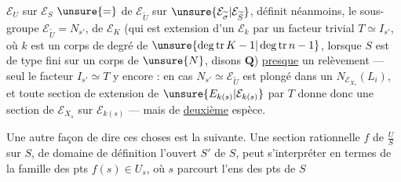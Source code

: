 $\mathcal E_U$ sur $\mathcal E_S$  $\unsure{=}$ de $\mathcal E_{\widetilde U}$ sur $\unsure{\mathcal E_{\widetilde\sigma}|\mathcal E_{\widetilde S}}$, définit néanmoins,  le sous-groupe $\mathcal E_{\widetilde U}=N_{s'}$, de $\mathcal E_K$ (qui est extension d'un $\mathcal E_k$ par un facteur trivial  $T\simeq I_{s'}$, où $k$ est un corps de degré de  $\unsure{\deg\operatorname{tr}K-1|\deg\operatorname{tr}n-1}$, lorsque $S$ est de type fini sur un corps de $\unsure{N}$, disons $\mathbf Q$) \uline{presque} un relèvement --- seul le facteur $I_{s'}\simeq T$ y  encore : en  cas $N_{s'}\simeq\mathcal E_{\widetilde U}$ est plongé dans un $N_{\mathcal E_{X_s}}(L_i)$, et toute section de  extension de $\unsure{E_{k(s)}|\mathcal E_{k(s)}}$ par $T$ donne donc une section de $\mathcal E_{X_s}$ sur $\mathcal E_{k(s)}$ --- mais de \uline{deuxième} espèce.

Une autre façon de dire ces choses est la suivante. Une section rationnelle $f$ de $\frac{U}{S}$ sur $S$, de domaine de définition l'ouvert $S'$ de $S$,  peut s'interpréter en termes de la famille des pts $f(s)\in U_s$, où $s$ parcourt l'ens des pts de $S$
